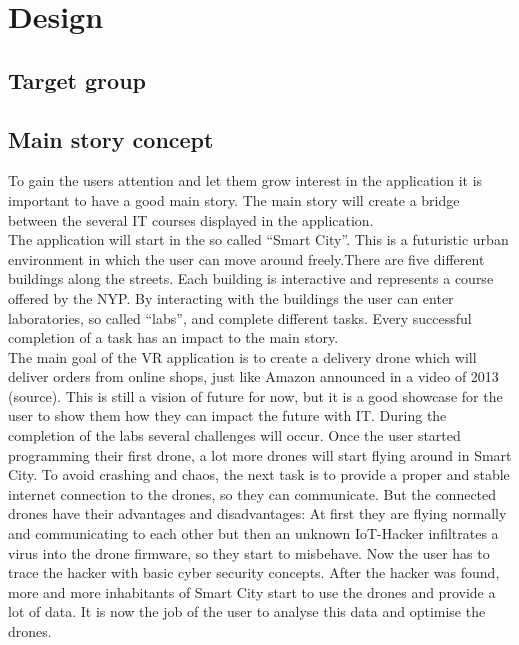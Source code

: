 \chapter{Design}
\section{Target group}
\section{Main story concept}
To gain the users attention and let them grow interest in the application it is important to have a good main story. The main story will create a bridge between the several IT courses displayed in the application.
\\
The application will start in the so called ``Smart City''. This is a futuristic urban environment in which the user can move around freely.There are five different buildings along the streets. Each building is interactive and represents a course offered by the NYP. By interacting with the buildings the user can enter laboratories, so called ``labs'', and complete different tasks. Every successful completion of a task has an impact to the main story. \\
The main goal of the VR application is to create a delivery drone which will deliver orders from online shops, just like Amazon announced in a video of 2013 (source). This is still a vision of future for now, but it is a good showcase for the user to show them how they can impact the future with IT. During the completion of the labs several challenges will occur. Once the user started programming their first drone, a lot more drones will start flying around in Smart City. To avoid crashing and chaos, the next task is to provide a proper and stable internet connection to the drones, so they can communicate. But the connected drones have their advantages and disadvantages: At first they are flying normally and communicating to each other but then an unknown IoT-Hacker infiltrates a virus into the drone firmware, so they start to misbehave. Now the user has to trace the hacker with basic cyber security concepts. After the hacker was found, more and more inhabitants of Smart City start to use the drones and provide a lot of data. It is now the job of the user to analyse this data and optimise the drones.